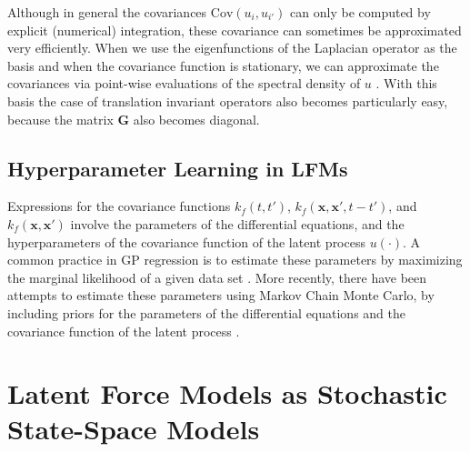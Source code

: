 \documentclass[journal]{IEEEtran}
\begin{document}
Although in general the covariances $\mathrm{Cov}(u_i,u_{i'})$ can only be computed by explicit (numerical) integration, these covariance can sometimes be approximated very efficiently. When we use the eigenfunctions of the Laplacian operator as the basis and when the covariance function is stationary, we can approximate the covariances via point-wise evaluations of the spectral density of $u$ \cite{Solin+Sarkka:2016}. With this basis the case of translation invariant operators also becomes particularly easy, because the matrix $\mathbf{G}$ also becomes diagonal.

\subsection{Hyperparameter Learning in LFMs}

Expressions for the covariance functions $k_{f}(t,t')$,
$k_{f}(\mathbf{x}, \mathbf{x}', t-t')$, and
$k_{f}(\mathbf{x}, \mathbf{x}')$ involve the parameters of the
differential equations, and the hyperparameters of the covariance
function of the latent process $u(\cdot)$. A common practice in GP
regression is to estimate these parameters by maximizing the marginal
likelihood of a given data set \cite{Rasmussen+Williams:2006}. More recently, there have been
attempts to estimate these parameters using Markov Chain Monte Carlo,
by including priors for the parameters of the differential equations
and the covariance function of the latent process
\cite{Titsias:control:vars:2009, Titsias:BMC:2012}.



\section{Latent Force Models as Stochastic State-Space Models}
\end{document}
